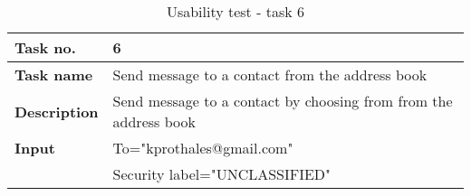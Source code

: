 \begin{table}[h!]
\begin{center}
\begin{tabular}{>{\bfseries}l|l}\hline
Task no.&6\\ \hline
Task name&Send message to a contact from the address book\\ \hline
Description&Send message to a contact by choosing from from the address book\\ \hline
Input&To="kprothales@gmail.com"\\
&Security label="UNCLASSIFIED"\\ \hline
\end{tabular}
\end{center}
\caption{Usability test - task 6} \label{tab:usabilitytask6}
\end{table}
